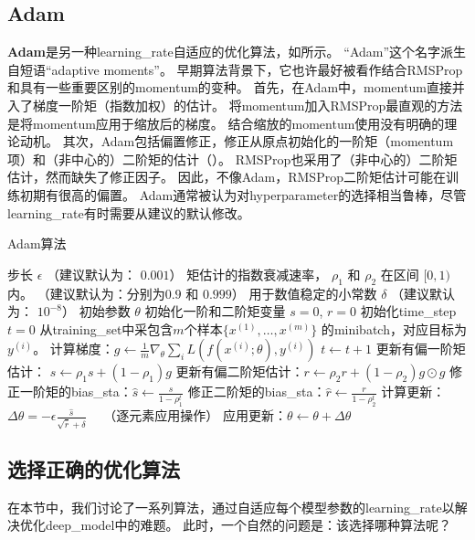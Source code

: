 \subsection{Adam}
\label{sec:adam}
\textbf{Adam}是另一种\gls{learning_rate}自适应的优化算法，如所示。
``Adam''这个名字派生自短语``adaptive moments''。
早期算法背景下，它也许最好被看作结合RMSProp和具有一些重要区别的\gls{momentum}的变种。
首先，在Adam中，\gls{momentum}直接并入了梯度一阶矩（指数加权）的估计。
将\gls{momentum}加入RMSProp最直观的方法是将\gls{momentum}应用于缩放后的梯度。
结合缩放的\gls{momentum}使用没有明确的理论动机。
其次，Adam包括偏置修正，修正从原点初始化的一阶矩（\gls{momentum}项）和（非中心的）二阶矩的估计（）。
RMSProp也采用了（非中心的）二阶矩估计，然而缺失了修正因子。
因此，不像Adam，RMSProp二阶矩估计可能在训练初期有很高的偏置。
Adam通常被认为对\gls{hyperparameter}的选择相当鲁棒，尽管\gls{learning_rate}有时需要从建议的默认修改。

\begin{algorithm}[ht]
	\caption{Adam算法}
	\label{alg:adam}
	\begin{algorithmic}
		\REQUIRE 步长 $\epsilon$ （建议默认为： $0.001$）
		\REQUIRE 矩估计的指数衰减速率， $\rho_1$ 和 $\rho_2$ 在区间 $[0, 1)$内。
		（建议默认为：分别为$0.9$ 和 $0.999$）
		\REQUIRE 用于数值稳定的小常数 $\delta$  （建议默认为： $10^{-8}$）
		\REQUIRE 初始参数 $\theta$
		\STATE 初始化一阶和二阶矩变量 $s = 0 $, $r = 0$
		\STATE 初始化\gls{time_step} $t=0$ 
		\STATE 从\gls{training_set}中采包含$m$个样本$\{ x^{(1)},\dots, x^{(m)}\}$ 的\gls{minibatch}，对应目标为$y^{(i)}$。
		\STATE 计算梯度：$g \leftarrow \frac{1}{m} \nabla_{\theta} \sum_i L(f(x^{(i)};\theta),y^{(i)})$ 
		\STATE $t \leftarrow t + 1$
		\STATE 更新有偏一阶矩估计： $s \leftarrow \rho_1 s + (1-\rho_1) g$
		\STATE 更新有偏二阶矩估计：$r \leftarrow \rho_2 r + (1-\rho_2)  g \odot g$
		\STATE 修正一阶矩的\gls{bias_sta}：$\hat{s} \leftarrow \frac{s}{1-\rho_1^t}$
		\STATE 修正二阶矩的\gls{bias_sta}：$\hat{r} \leftarrow \frac{r}{1-\rho_2^t}$
		\STATE 计算更新：$\Delta \theta = - \epsilon \frac{\hat{s}}{\sqrt{\hat{r}} + \delta}$ \ \  （逐元素应用操作）
		\STATE 应用更新：$\theta \leftarrow \theta + \Delta \theta$
		\ENDWHILE
	\end{algorithmic}
\end{algorithm}

\subsection{选择正确的优化算法}
\label{sec:choosing_the_right_optimization_algorithms}
在本节中，我们讨论了一系列算法，通过自适应每个模型参数的\gls{learning_rate}以解决优化\gls{deep_model}中的难题。
此时，一个自然的问题是：该选择哪种算法呢？

